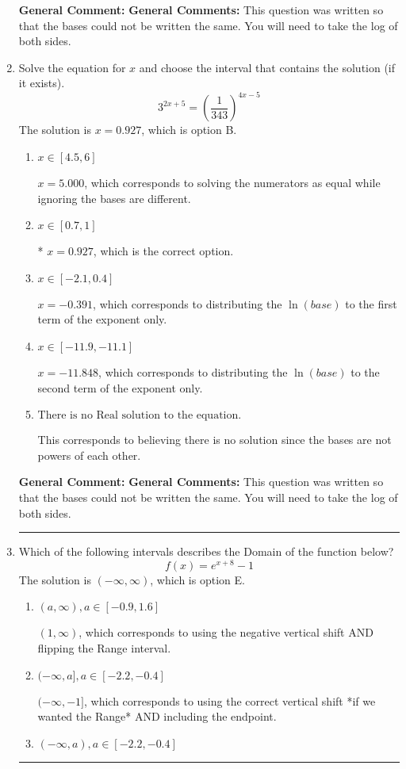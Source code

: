 \documentclass{extbook}[14pt]
\newcommand{\litem}[1]{\item #1

\rule{\textwidth}{0.4pt}}
\begin{document}
\begin{enumerate}
{\textbf{General Comment:} \textbf{General Comments:} This question was written so that the bases could not be written the same. You will need to take the log of both sides.
}
\litem{
Solve the equation for $x$ and choose the interval that contains the solution (if it exists).
\[ 3^{2x+5} = \left(\frac{1}{343}\right)^{4x-5} \]The solution is \( x = 0.927 \), which is option B.\begin{enumerate}[label=\Alph*.]
\item \( x \in [4.5, 6] \)

$x = 5.000$, which corresponds to solving the numerators as equal while ignoring the bases are different.
\item \( x \in [0.7, 1] \)

* $x = 0.927$, which is the correct option.
\item \( x \in [-2.1, 0.4] \)

$x = -0.391$, which corresponds to distributing the $\ln(base)$ to the first term of the exponent only.
\item \( x \in [-11.9, -11.1] \)

$x = -11.848$, which corresponds to distributing the $\ln(base)$ to the second term of the exponent only.
\item \( \text{There is no Real solution to the equation.} \)

This corresponds to believing there is no solution since the bases are not powers of each other.
\end{enumerate}

\textbf{General Comment:} \textbf{General Comments:} This question was written so that the bases could not be written the same. You will need to take the log of both sides.
}
\litem{
Which of the following intervals describes the Domain of the function below?
\[ f(x) = e^{x+8}-1 \]The solution is \( (-\infty, \infty) \), which is option E.\begin{enumerate}[label=\Alph*.]
\item \( (a, \infty), a \in [-0.9, 1.6] \)

$(1, \infty)$, which corresponds to using the negative vertical shift AND flipping the Range interval.
\item \( (-\infty, a], a \in [-2.2, -0.4] \)

$(-\infty, -1]$, which corresponds to using the correct vertical shift *if we wanted the Range* AND including the endpoint.
\item \( (-\infty, a), a \in [-2.2, -0.4] \)


\end{enumerate}}
\end{enumerate}
\end{document}
